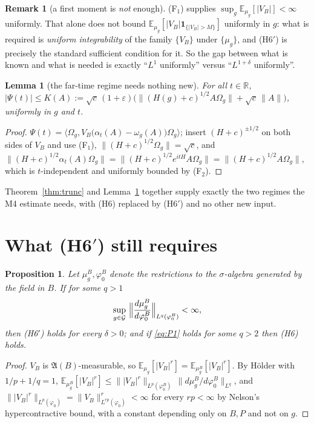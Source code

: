 \documentclass[11pt,a4paper]{article}
\theoremstyle{plain}
\newtheorem{proposition}[theorem]{Proposition}
\newtheorem{lemma}[theorem]{Lemma}
\theoremstyle{definition}
\newtheorem{remark}[theorem]{Remark}
\newcommand{\A}{\mathfrak{A}}
\newcommand{\R}{\mathbb{R}}
\newcommand{\Om}{\Omega}
\newcommand{\ip}[2]{\langle #1,#2\rangle}
\begin{document}
\begin{remark}[a first moment is \emph{not} enough]
(F$_1$) supplies $\sup_g\mathbb E_{\mu_g}[|V_B|]<\infty$ uniformly. That alone does not bound
$\mathbb E_{\mu_g}[|V_B|\mathbf 1_{\{|V_B|>M\}}]$ uniformly in $g$: what is required is
\emph{uniform integrability} of the family $\{V_B\}$ under $\{\mu_g\}$, and (H6$'$) is precisely
the standard sufficient condition for it. So the gap between what is known and what is needed is
exactly ``$L^1$ uniformly'' versus ``$L^{1+\delta}$ uniformly''.
\end{remark}

\begin{lemma}[the far-time regime needs nothing new]\label{lem:fartime}
For all $t\in\R$, $|\Psi(t)|\le K(A):=\sqrt c\,(1+\varepsilon)\bigl(\|(H(g)+c)^{1/2}A\Om_g\|
+\sqrt c\,\|A\|\bigr)$, uniformly in $g$ and $t$.
\end{lemma}

\begin{proof}
$\Psi(t)=\ip{\Om_g}{V_B\bigl(\alpha_t(A)-\omega_g(A)\bigr)\Om_g}$; insert
$(H+c)^{\pm1/2}$ on both sides of $V_B$ and use (F$_1$), $\|(H+c)^{1/2}\Om_g\|=\sqrt c$, and
$\|(H+c)^{1/2}\alpha_t(A)\Om_g\|=\|(H+c)^{1/2}e^{itH}A\Om_g\|=\|(H+c)^{1/2}A\Om_g\|$, which is
$t$-independent and uniformly bounded by (F$_2$).
\end{proof}

Theorem~\ref{thm:trunc} and Lemma~\ref{lem:fartime} together supply exactly the two regimes the
M4 estimate needs, with (H6) replaced by (H6$'$) and no other new input.

\section{What (H6$'$) still requires}\label{sec:red}

\begin{proposition}\label{prop:red}
Let $\mu_g^B,\varphi_0^B$ denote the restrictions to the $\sigma$-algebra generated by the field in
$B$. If for some $q>1$
\begin{equation}\label{eq:P1}
  \sup_{g\in\mathcal G}\ \Bigl\|\frac{d\mu_g^B}{d\varphi_0^B}\Bigr\|_{L^q(\varphi_0^B)}<\infty ,
\end{equation}
then \textup{(H6$'$)} holds for every $\delta>0$; and if \eqref{eq:P1} holds for some $q>2$ then
\textup{(H6)} holds.
\end{proposition}

\begin{proof}
$V_B$ is $\A(B)$-measurable, so $\mathbb E_{\mu_g}[|V_B|^{r}]=\mathbb E_{\mu_g^B}[|V_B|^{r}]$.
By H\"older with $1/p+1/q=1$,
$\mathbb E_{\mu_g^B}[|V_B|^{r}]\le\||V_B|^{r}\|_{L^p(\varphi_0^B)}\,\|d\mu_g^B/d\varphi_0^B\|_{L^q}$,
and $\||V_B|^r\|_{L^p(\varphi_0)}=\|V_B\|_{L^{rp}(\varphi_0)}^r<\infty$ for every $rp<\infty$ by
Nelson's hypercontractive bound, with a constant depending only on $B,P$ and not on $g$.
\end{proof}
\end{document}
